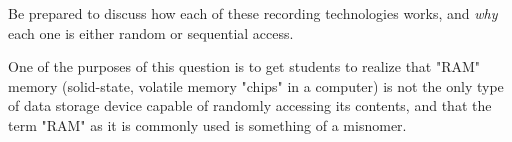 Be prepared to discuss how each of these recording technologies works, and {\it why} each one is either random or sequential access.







One of the purposes of this question is to get students to realize that "RAM" memory (solid-state, volatile memory "chips" in a computer) is not the only type of data storage device capable of randomly accessing its contents, and that the term "RAM" as it is commonly used is something of a misnomer.




